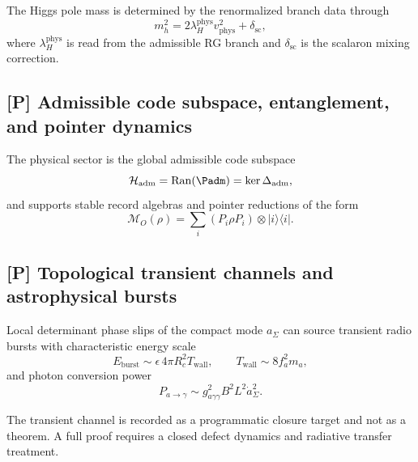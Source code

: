 \begin{conjecture}
\label{thm:higgs_pole_readout_rg_branch}
The Higgs pole mass is determined by the renormalized branch data through
\[
m_h^2=2\lambda_H^{\mathrm{phys}}v_{\mathrm{phys}}^2+\delta_{\mathrm{sc}},
\]
where \(\lambda_H^{\mathrm{phys}}\) is read from the admissible RG branch and
\(\delta_{\mathrm{sc}}\) is the scalaron mixing correction.
\end{conjecture}

\subsection{[P] Admissible code subspace, entanglement, and pointer dynamics}

\begin{conjecture}
\label{prop:global_admissible_code_subspace}
The physical sector is the global admissible code subspace
\[
\mathcal H_{\mathrm{adm}}=\operatorname{Ran}(\Padm)=\ker\Delta_{\mathrm{adm}},
\]
and supports stable record algebras and pointer reductions of the form
\[
\mathcal M_O(\rho)=\sum_i (P_i\rho P_i)\otimes |i\rangle\langle i|.
\]
\end{conjecture}

\subsection{[P] Topological transient channels and astrophysical bursts}

\begin{conjecture}
\label{conj:topological_phase_slip_burst_channel}
Local determinant phase slips of the compact mode \(a_\Sigma\) can source transient
radio bursts with characteristic energy scale
\[
E_{\mathrm{burst}}\sim \epsilon\,4\pi R_c^2T_{\mathrm{wall}},
\qquad
T_{\mathrm{wall}}\sim 8f_a^2m_a,
\]
and photon conversion power
\[
P_{a\to\gamma}\sim g_{a\gamma\gamma}^2B^2L^2\dot a_\Sigma^2.
\]
\end{conjecture}

\begin{remark}
The transient channel is recorded as a programmatic closure target and not as a theorem. A full
proof requires a closed defect dynamics and radiative transfer treatment.
\end{remark}


